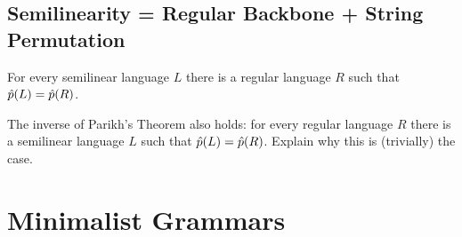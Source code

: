 \subsection{Semilinearity = Regular Backbone + String Permutation}

\begin{theorem}
    For every semilinear language $L$ there is a regular language $R$ such that $\hat{p}(L) = \hat{p}(R)$.
\end{theorem}
%
\begin{exercise}
    The inverse of Parikh's Theorem also holds: for every regular language $R$ there is a semilinear language $L$ such that $\hat{p}(L) = \hat{p}(R)$.
    Explain why this is (trivially) the case.
\end{exercise}


\section{Minimalist Grammars}
